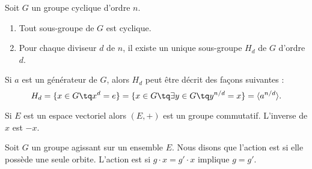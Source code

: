 \begin{theorem}
    Soit \( G\) un groupe cyclique d'ordre \( n\).
    \begin{enumerate}
        \item
            Tout sous-groupe de \( G\) est cyclique.
        \item 
            Pour chaque diviseur \( d\) de \( n\), il existe un unique sous-groupe \( H_d\) de \( G\) d'ordre \( d\).
    \end{enumerate}
    Si \( a\) est un générateur de \( G\), alors \( H_d\) peut être décrit des façons suivantes :
    \begin{equation}
        H_d=\{ x\in G\tq x^d=e \}=\{ x\in G\tq\exists y\in G\tq y^{n/d}=x \}=\langle a^{n/d}\rangle.
    \end{equation}
\end{theorem}

\begin{example}     \label{ExemMaKdwt}
    Si \( E\) est un espace vectoriel alors \( (E,+)\) est un groupe commutatif. L'inverse de \( x\) est \( -x\).
\end{example}

\begin{definition}
    Soit \( G\) un groupe agissant sur un ensemble \( E\). Nous disons que l'action est  si elle possède une seule orbite. L'action est  si \( g\cdot x=g'\cdot x\) implique \( g=g'\).
\end{definition}
